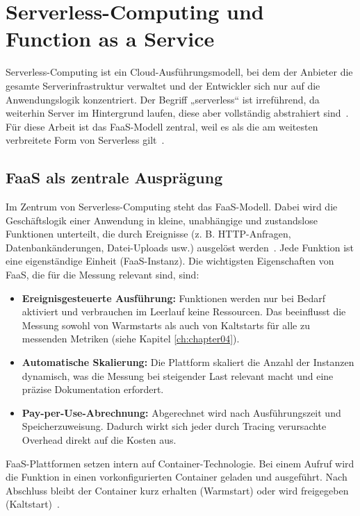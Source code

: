 \section{Serverless-Computing und Function as a Service}
\label{sec:serverless}

Serverless-Computing ist ein Cloud-Ausführungsmodell, bei dem der Anbieter die gesamte Serverinfrastruktur verwaltet und der Entwickler sich nur auf die Anwendungslogik konzentriert. Der Begriff „serverless“ ist irreführend, da weiterhin Server im Hintergrund laufen, diese aber vollständig abstrahiert sind~\cite{IBMFaaS}.  
Für diese Arbeit ist das \ac{FaaS}-Modell zentral, weil es als die am weitesten verbreitete Form von Serverless gilt~\cite{ServerlessAWSLambda}.

\subsection{FaaS als zentrale Ausprägung}
Im Zentrum von Serverless-Computing steht das \ac{FaaS}-Modell.
Dabei wird die Geschäftslogik einer Anwendung in kleine, unabhängige und zustandslose Funktionen unterteilt, die durch Ereignisse (z. B. \ac{HTTP}-Anfragen, Datenbankänderungen, Datei-Uploads usw.) ausgelöst werden~\cite{IBMFaaS}. 
Jede Funktion ist eine eigenständige Einheit (\ac{FaaS}-Instanz).
Die wichtigsten Eigenschaften von \ac{FaaS}, die für die Messung relevant sind, sind:
\begin{itemize}
    \item \textbf{Ereignisgesteuerte Ausführung:} Funktionen werden nur bei Bedarf aktiviert und verbrauchen im Leerlauf keine Ressourcen. Das beeinflusst die Messung sowohl von Warmstarts als auch von Kaltstarts für alle zu messenden Metriken (siehe Kapitel \ref{ch:chapter04}).
    \item \textbf{Automatische Skalierung:} Die Plattform skaliert die Anzahl der Instanzen dynamisch, was die Messung bei steigender Last relevant macht und eine präzise Dokumentation erfordert.
    \item \textbf{Pay-per-Use-Abrechnung:} Abgerechnet wird nach Ausführungszeit und Speicherzuweisung. Dadurch wirkt sich jeder durch Tracing verursachte Overhead direkt auf die Kosten aus.
\end{itemize}
FaaS-Plattformen setzen intern auf Container-Technologie. Bei einem Aufruf wird die Funktion in einen vorkonfigurierten Container geladen und ausgeführt. Nach Abschluss bleibt der Container kurz erhalten (Warmstart) oder wird freigegeben (Kaltstart)~\cite{ServerlessAWSLambda}.

